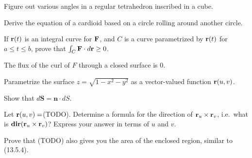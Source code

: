 \documentclass[11pt,oneside]{amsart}
\begin{document}
  \begin{problem}
    Figure out various angles in a regular tetrahedron inscribed in a cube.
  \end{problem}

  \begin{problem}
    Derive the equation of a cardioid based on a circle rolling around another circle.
  \end{problem}

  \begin{problem}
    If $\mathbf r(t)$ is an integral curve for $\mathbf F$, and $C$ is a curve parametrized by $\mathbf r(t)$ for $a\leq t\leq b$, prove that $\int_C\mathbf F\cdot d\mathbf r\geq 0$.
  \end{problem}

  \begin{problem}
    The flux of the curl of $F$ through a closed surface is 0.
  \end{problem}

  \begin{problem}
    Parametrize the surface $z=\sqrt{1-x^2-y^2}$ as a vector-valued function $\mathbf r(u,v)$.
  \end{problem}

  \begin{problem}
    Show that $d\mathbf S=\mathbf n\cdot dS$.
  \end{problem}

  \begin{problem}
    Let $\mathbf r(u,v)=$(TODO). Determine a formula for the direction of $\mathbf r_u\times \mathbf r_v$, i.e.\ what is $\operatorname{\mathbf{dir}}(\mathbf r_u\times\mathbf r_v)$? Express your answer in terms of $u$ and $v$.
  \end{problem}
  \begin{problem}
    Prove that (TODO) also gives you the area of the enclosed region, similar to (13.5.4).
  \end{problem}
\end{document}
